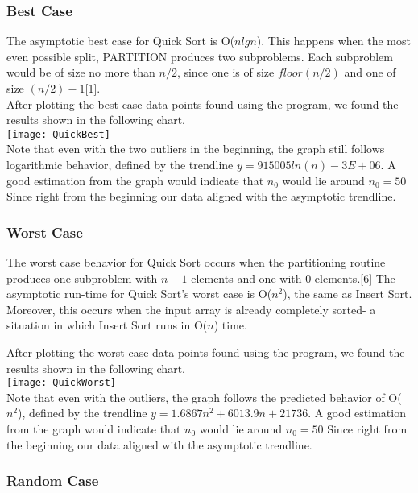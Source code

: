 \documentclass[12pt]{article}
\begin{document}
\subsubsection*{Best Case}

The asymptotic best case for Quick Sort is O($nlgn$). This happens when the most even possible split, PARTITION produces two subproblems. Each subproblem would be of size no more than $n/2$, since one is of size $floor(n/2)$ and one of size $(n/2)-1$[1].\\

After plotting the best case data points found using the program, we found the results shown in the following chart. \\

\texttt{[image: QuickBest]}\\

Note that even with the two outliers in the beginning, the graph still follows logarithmic behavior, defined by the trendline $y = 915005ln(n) -3E+06$. A good estimation from the graph would indicate that $n_0$ would lie around $n_0 = 50 $ Since right from the beginning our data aligned with the asymptotic trendline.

\subsubsection*{Worst  Case}

The worst case behavior for Quick Sort occurs when the partitioning routine produces one subproblem with $n-1$ elements and one with 0 elements.[6] The asymptotic run-time for Quick Sort's worst case is O($n^2$), the same as Insert Sort. Moreover, this occurs when the input array is already completely sorted- a situation in which Insert Sort runs in O($n$) time.

After plotting the worst case data points found using the program, we found the results shown in the following chart. \\

\texttt{[image: QuickWorst]}\\

Note that even with the outliers, the graph follows the predicted behavior of O($n^2$), defined by the trendline $y = 1.6867n^2 + 6013.9n+21736$. A good estimation from the graph would indicate that $n_0$ would lie around $n_0 = 50 $ Since right from the beginning our data aligned with the asymptotic trendline.

\subsubsection*{Random Case}
\end{document}
